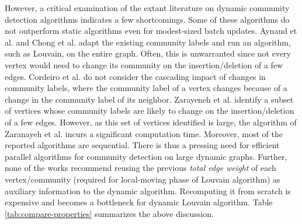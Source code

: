 However, a critical examination of the extant literature on dynamic community detection algorithms indicates a few shortcomings. Some of these algorithms \cite{com-cordeiro16, com-meng16} do not outperform static algorithms even for modest-sized batch updates. Aynaud et al. \cite{com-aynaud10} and Chong et al. \cite{com-chong13} adapt the existing community labels and run an algorithm, such as Louvain, on the entire graph. Often, this is unwarranted since not every vertex would need to change its community on the insertion/deletion of a few edges. Cordeiro et al. \cite{com-cordeiro16} do not consider the cascading impact of changes in community labels, where the community label of a vertex changes because of a change in the community label of its neighbor. Zarayeneh et al. \cite{com-zarayeneh21} identify a subset of vertices whose community labels are likely to change on the insertion/deletion of a few edges. However, as this set of vertices identified is large, the algorithm of Zaranayeh et al. incurs a significant computation time. Moreover, most of the reported algorithms \cite{com-aynaud10, com-chong13, com-meng16, com-cordeiro16, com-zhuang19, com-zarayeneh21} are sequential. There is thus a pressing need for efficient parallel algorithms for community detection on large dynamic graphs. Further, none of the works recommend reusing the previous \textit{total edge weight} of each vertex/community (required for local-moving phase of Louvain algorithm) as auxiliary information to the dynamic algorithm. Recomputing it from scratch is expensive and becomes a bottleneck for dynamic Louvain algorithm. Table \ref{tab:compare-properties} summarizes the above discussion.






